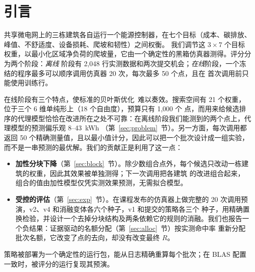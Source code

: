 \section{引言}
\label{sec:intro}
共享微电网上的三栋建筑各自运行一个能源控制器，在七个目标（成本、碳排放、峰值、不舒适度、设备损耗、爬坡和韧性）之间权衡。
我们调节这 $3\times7$ 个目标权重，以最小化区域净负荷的爬坡量，它由一个确定性的黑箱仿真器测得。评分分为两个阶段：\emph{离线}
阶段有 2,048 行实测数据和两次提交机会；\emph{在线}阶段，一个冻结的程序最多可以顺序调用仿真器 20 次，每次最多 50 个点，且在
首次调用前只能使用训练行。

在线阶段有三个特点，使标准的贝叶斯优化~\cite{rasmussen,turbo}难以奏效。搜索空间有 21 个权重，位于三个 6 维单纯形上（18 个自由度），预算只有 1,000 个
点，而用来给候选排序的代理模型恰恰在改进所在之处不可靠：在离线阶段我们能测到的两个点上，代理模型的预测偏乐观 8--43~kWh
（第~\ref{sec:problem}~节）。另一方面，每次调用都返回 50 个精确测量值，且以最小值计分，因此可以把一个批次设计成一组实验，
而不是一串预测的最优解。我们的贡献正是利用了这一点：
\begin{itemize}
\item \textbf{加性分块下降}（第~\ref{sec:block}~节）。除少数组合点外，每个候选只改动一栋建筑的权重，因此其效果被单独测得；下一次调用把各建筑
的改进组合起来，组合的值由加性模型仅凭实测效果预测，无需拟合模型。
\item \textbf{受控的评估}（第~\ref{sec:exp}~节）。在课程发布的仿真器上做完整的 20 次调用预演，v2、v4 和消融变体各六个种子，v1 和提交的策略各三个
种子，用精确置换检验，并设计一个去掉分块结构及两条依赖它的规则的消融。我们也报告一个负结果：证据驱动的名额分配（第~\ref{sec:alloc}~节）按实测命中率
重新分配批次名额，它改变了点的去向，却没有改变最终 $R$。
\end{itemize}
策略被部署为一个确定性的运行包，能从日志精确重算每个批次；在 BLAS 配置一致时，被评分的运行复现其预演。
